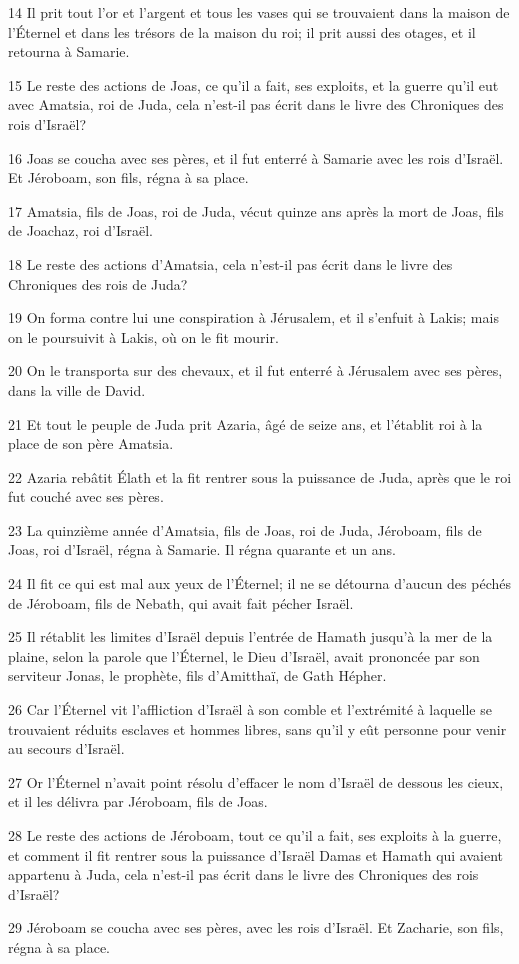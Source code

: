 \par 14 Il prit tout l'or et l'argent et tous les vases qui se trouvaient dans la maison de l'Éternel et dans les trésors de la maison du roi; il prit aussi des otages, et il retourna à Samarie.
\par 15 Le reste des actions de Joas, ce qu'il a fait, ses exploits, et la guerre qu'il eut avec Amatsia, roi de Juda, cela n'est-il pas écrit dans le livre des Chroniques des rois d'Israël?
\par 16 Joas se coucha avec ses pères, et il fut enterré à Samarie avec les rois d'Israël. Et Jéroboam, son fils, régna à sa place.
\par 17 Amatsia, fils de Joas, roi de Juda, vécut quinze ans après la mort de Joas, fils de Joachaz, roi d'Israël.
\par 18 Le reste des actions d'Amatsia, cela n'est-il pas écrit dans le livre des Chroniques des rois de Juda?
\par 19 On forma contre lui une conspiration à Jérusalem, et il s'enfuit à Lakis; mais on le poursuivit à Lakis, où on le fit mourir.
\par 20 On le transporta sur des chevaux, et il fut enterré à Jérusalem avec ses pères, dans la ville de David.
\par 21 Et tout le peuple de Juda prit Azaria, âgé de seize ans, et l'établit roi à la place de son père Amatsia.
\par 22 Azaria rebâtit Élath et la fit rentrer sous la puissance de Juda, après que le roi fut couché avec ses pères.
\par 23 La quinzième année d'Amatsia, fils de Joas, roi de Juda, Jéroboam, fils de Joas, roi d'Israël, régna à Samarie. Il régna quarante et un ans.
\par 24 Il fit ce qui est mal aux yeux de l'Éternel; il ne se détourna d'aucun des péchés de Jéroboam, fils de Nebath, qui avait fait pécher Israël.
\par 25 Il rétablit les limites d'Israël depuis l'entrée de Hamath jusqu'à la mer de la plaine, selon la parole que l'Éternel, le Dieu d'Israël, avait prononcée par son serviteur Jonas, le prophète, fils d'Amitthaï, de Gath Hépher.
\par 26 Car l'Éternel vit l'affliction d'Israël à son comble et l'extrémité à laquelle se trouvaient réduits esclaves et hommes libres, sans qu'il y eût personne pour venir au secours d'Israël.
\par 27 Or l'Éternel n'avait point résolu d'effacer le nom d'Israël de dessous les cieux, et il les délivra par Jéroboam, fils de Joas.
\par 28 Le reste des actions de Jéroboam, tout ce qu'il a fait, ses exploits à la guerre, et comment il fit rentrer sous la puissance d'Israël Damas et Hamath qui avaient appartenu à Juda, cela n'est-il pas écrit dans le livre des Chroniques des rois d'Israël?
\par 29 Jéroboam se coucha avec ses pères, avec les rois d'Israël. Et Zacharie, son fils, régna à sa place.

